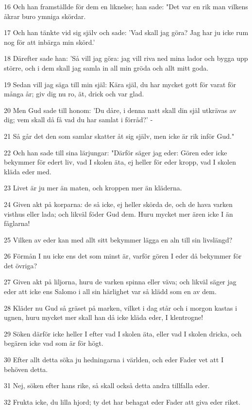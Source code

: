 \par 16 Och han framställde för dem en liknelse; han sade: "Det var en rik man vilkens åkrar buro ymniga skördar.
\par 17 Och han tänkte vid sig själv och sade: 'Vad skall jag göra? Jag har ju icke rum nog för att inbärga min skörd.'
\par 18 Därefter sade han: 'Så vill jag göra: jag vill riva ned mina lador och bygga upp större, och i dem skall jag samla in all min gröda och allt mitt goda.
\par 19 Sedan vill jag säga till min själ: Kära själ, du har mycket gott för varat för många år; giv dig nu ro, ät, drick och var glad.
\par 20 Men Gud sade till honom: 'Du dåre, i denna natt skall din själ utkrävas av dig; vem skall då få vad du har samlat i förråd?' -
\par 21 Så går det den som samlar skatter åt sig själv, men icke är rik inför Gud."
\par 22 Och han sade till sina lärjungar: "Därför säger jag eder: Gören eder icke bekymmer för edert liv, vad I skolen äta, ej heller för eder kropp, vad I skolen kläda eder med.
\par 23 Livet är ju mer än maten, och kroppen mer än kläderna.
\par 24 Given akt på korparna: de så icke, ej heller skörda de, och de hava varken visthus eller lada; och likväl föder Gud dem. Huru mycket mer ären icke I än fåglarna!
\par 25 Vilken av eder kan med allt sitt bekymmer lägga en aln till sin livslängd?
\par 26 Förmån I nu icke ens det som minst är, varför gören I eder då bekymmer för det övriga?
\par 27 Given akt på liljorna, huru de varken spinna eller väva; och likväl säger jag eder att icke ens Salomo i all sin härlighet var så klädd som en av dem.
\par 28 Kläder nu Gud så gräset på marken, vilket i dag står och i morgon kastas i ugnen, huru mycket mer skall han då icke kläda eder, I klentrogne!
\par 29 Söken därför icke heller I efter vad I skolen äta, eller vad I skolen dricka, och begären icke vad som är för högt.
\par 30 Efter allt detta söka ju hedningarna i världen, och eder Fader vet att I behöven detta.
\par 31 Nej, söken efter hans rike, så skall också detta andra tillfalla eder.
\par 32 Frukta icke, du lilla hjord; ty det har behagat eder Fader att giva eder riket.
